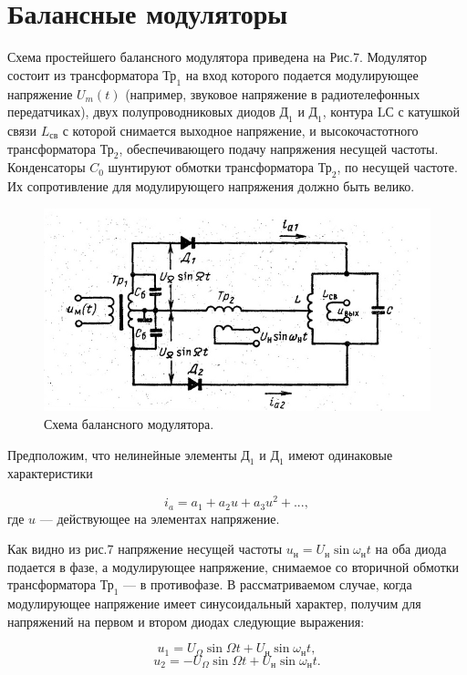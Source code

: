 \section{Балансные модуляторы}

Схема простейшего балансного модулятора приведена на Рис.7. Модулятор состоит из трансформатора $\text{Тр}_1$ на вход которого подается модулирующее напряжение $U_m(t)$ (например, звуковое напряжение в радиотелефонных передатчиках), двух полупроводниковых диодов $\text{Д}_1$ и $\text{Д}_1$, контура LС с катушкой связи $L_{\text{св}}$ с которой снимается выходное напряжение, и высокочастотного трансформатора $\text{Тр}_2$, обеспечивающего подачу напряжения несущей частоты. Конденсаторы $C_0$ шунтируют обмотки трансформатора $\text{Тр}_2$, по несущей частоте. Их сопротивление для модулирующего напряжения должно быть велико. 

\begin{figure}[h!]
	\centering
	\includegraphics[width=0.8\linewidth]{fig/fig7}
	\caption{Схема балансного модулятора.}
	\label{fig:fig7}
\end{figure}

Предположим, что нелинейные элементы $\text{Д}_1$ и $\text{Д}_1$ имеют одинаковые
характеристики

$$i_a = a_1 + a_2u + a_3u^2+...,$$ 
где $u$ — действующее на элементах напряжение. 

Как видно из рис.7 напряжение несущей частоты $u_{\text{н}} = U_{\text{н}}\sin{\omega_{\text{н}}t}$ на оба диода подается в фазе, а модулирующее напряжение, снимаемое со вторичной обмотки трансформатора $\text{Тр}_1$ — в противофазе. В рассматриваемом случае,
когда модулирующее напряжение имеет синусоидальный характер, получим для напряжений на первом и втором диодах следующие выражения:

$$u_1 = U_{\Omega} \sin{\Omega t}+U_{\text{н}}\sin{\omega_{\text{н}}t},$$
$$u_2 = -U_{\Omega} \sin{\Omega t}+U_{\text{н}}\sin{\omega_{\text{н}}t}.$$

